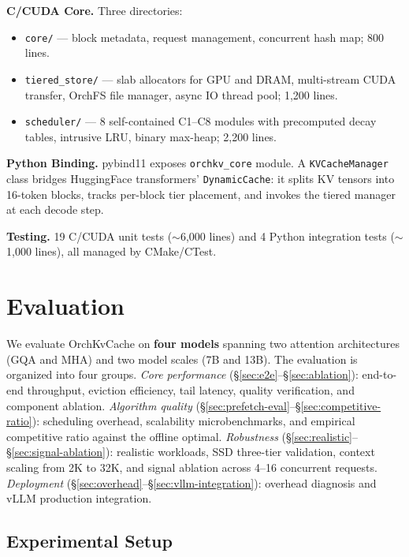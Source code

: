 \documentclass[conference]{IEEEtran}
\begin{document}
\textbf{C/CUDA Core.} Three directories:
\begin{itemize}
\item \texttt{core/} --- block metadata, request management, concurrent hash map; 800 lines.
\item \texttt{tiered\_store/} --- slab allocators for GPU and DRAM, multi-stream CUDA transfer, OrchFS file manager, async IO thread pool; 1,200 lines.
\item \texttt{scheduler/} --- 8 self-contained C1--C8 modules with precomputed decay tables, intrusive LRU, binary max-heap; 2,200 lines.
\end{itemize}

\textbf{Python Binding.} pybind11 exposes \texttt{orchkv\_core} module. A \texttt{KVCacheManager} class bridges HuggingFace transformers' \texttt{DynamicCache}: it splits KV tensors into 16-token blocks, tracks per-block tier placement, and invokes the tiered manager at each decode step.

\textbf{Testing.} 19 C/CUDA unit tests (${\sim}$6,000 lines) and 4 Python integration tests (${\sim}$1,000 lines), all managed by CMake/CTest.

\section{Evaluation}

We evaluate OrchKvCache on \textbf{four models} spanning two attention architectures (GQA and MHA) and two model scales (7B and 13B). The evaluation is organized into four groups. \emph{Core performance} (\S\ref{sec:e2e}--\S\ref{sec:ablation}): end-to-end throughput, eviction efficiency, tail latency, quality verification, and component ablation. \emph{Algorithm quality} (\S\ref{sec:prefetch-eval}--\S\ref{sec:competitive-ratio}): scheduling overhead, scalability microbenchmarks, and empirical competitive ratio against the offline optimal. \emph{Robustness} (\S\ref{sec:realistic}--\S\ref{sec:signal-ablation}): realistic workloads, SSD three-tier validation, context scaling from 2K to 32K, and signal ablation across 4--16 concurrent requests. \emph{Deployment} (\S\ref{sec:overhead}--\S\ref{sec:vllm-integration}): overhead diagnosis and vLLM production integration.

\subsection{Experimental Setup}
\end{document}
